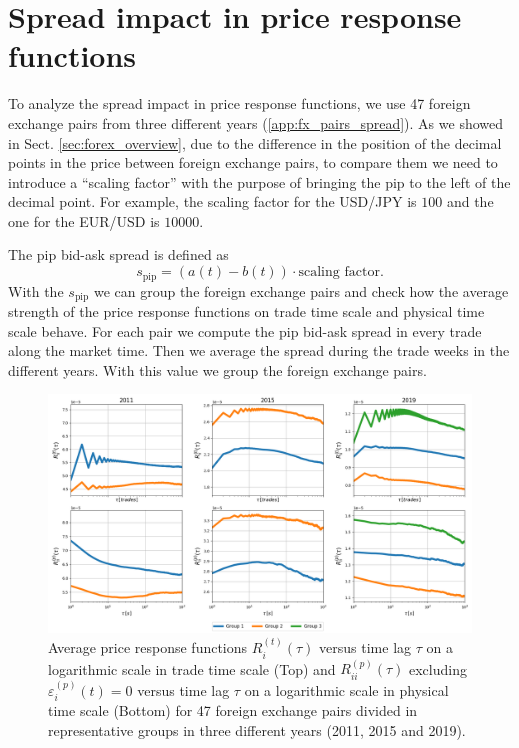\section{Spread impact in price response functions}\label{sec:spread_impact}

To analyze the spread impact in price response functions, we use 47 foreign
exchange pairs from three different years (\ref{app:fx_pairs_spread}).
As we showed in Sect. \ref{sec:forex_overview}, due to the difference in the
position of the decimal points in the price between foreign exchange pairs, to
compare them we need to introduce a ``scaling factor'' with the purpose of
bringing the pip to the left of the decimal point. For example, the scaling
factor for the USD/JPY is $100$ and the one for the EUR/USD is $10000$.

The pip bid-ask spread is defined as \cite{micro_eff}
\begin{equation}
    s_{\textrm{pip}} = \left(a\left(t\right) - b\left(t\right)\right) \cdot
    \textrm{scaling factor}.
\end{equation}
With the $s_{\textrm{pip}}$ we can group the foreign exchange pairs and check
how the average strength of the price response functions on trade time scale
and physical time scale behave. For each pair we compute the pip bid-ask spread
in every trade along the market time. Then we average the spread during the
trade weeks in the different years. With this value we group the foreign
exchange pairs.

\begin{figure}[htbp]
    \centering
    \includegraphics[width=\textwidth]{figures/05_spread_impact.png}
    \caption{Average price response functions
             $R^{\left(t\right)}_{i}\left(\tau\right)$ versus time lag $\tau$
             on a logarithmic scale in trade time scale (Top) and
             $R^{\left(p\right)}_{ii}\left(\tau\right)$ excluding
             $\varepsilon^{\left(p\right)}_{i}\left(t\right) = 0$ versus time
             lag $\tau$ on a logarithmic scale in physical time scale (Bottom)
             for 47 foreign exchange pairs divided in representative groups in
             three different years (2011, 2015 and 2019).}
    \label{fig:spread_impact}
\end{figure}

